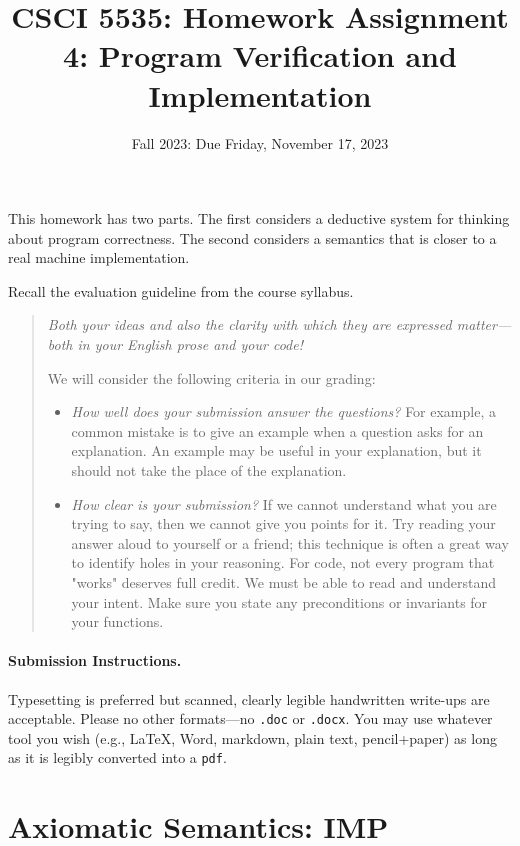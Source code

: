 \documentclass[12pt]{exam}
\title{CSCI 5535: Homework Assignment 4: Program Verification and Implementation}
\date{Fall 2023: Due Friday, November 17, 2023}
\author{}
\newcommand{\IMP}{\textbf{\textsf{IMP}}\xspace}
\begin{document}
\maketitle

This homework has two parts.
%
The first considers a deductive system for thinking about program correctness.
%
The second considers a semantics that is closer to a real machine implementation.

Recall the evaluation guideline from the course syllabus.
\begin{quote}\em
  Both your ideas and also the clarity with which they are expressed
  matter---both in your English prose and your code!

  We will consider the following criteria in our grading: 
  \begin{itemize}
    \item \emph{How well does your submission answer the questions?}
      For example, a common mistake is to give an example when a question
      asks for an explanation.  An example may be useful in your
      explanation, but it should not take the place of the explanation.
    \item \emph{How clear is your submission?}  If we cannot
      understand what you are trying to say, then we cannot give you
      points for it.  Try reading your answer aloud to yourself or a
      friend; this technique is often a great way to identify holes in
      your reasoning.  For code, not every program that "works"
      deserves full credit. We must be able to read and understand
      your intent.  Make sure you state any preconditions or
      invariants for your functions.
  \end{itemize}
\end{quote}

\paragraph{Submission Instructions.}

Typesetting is preferred but scanned, clearly legible handwritten write-ups are acceptable. Please no other formats---no
\texttt{.doc} or \texttt{.docx}. You may use whatever tool you wish (e.g., \LaTeX, Word, markdown, plain text, pencil+paper) as long as it is legibly
converted into a \texttt{pdf}.

\section{Axiomatic Semantics: \IMP}
\end{document}
